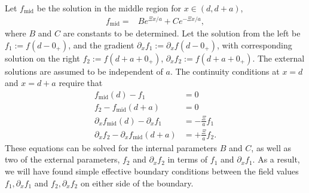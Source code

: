 Let $f_{\text{mid}}$ be the solution in the middle region for $x\in(d,d+a)$,   
    \begin{align}
      f_{\text{mid}} %
      =& Be^{\Xi x/a} + C e^{-\Xi x/a},
    \end{align}
    where $B$ and $C$ are constants to be determined.
    Let the solution from the left be $f_1:=f(d-0_+)$, and the gradient $\partial_x f_1:=\partial_x f(d-0_+)$,
    with corresponding solution on the right $f_2:=f(d+a+0_+)$, $\partial_x f_2:=f(d+a+0_+)$.  The
    external solutions are assumed to be independent of $a$.%
    The continuity conditions at $x=d$ and $x=d+a$ require that
    \begin{subequations}
      \begin{align}
        f_{\text{mid}}(d)-f_1 &= 0 \label{eq:f1}\\
        f_2- f_{\text{mid}}(d+a)&= 0 \label{eq:f2}\\
        \partial_xf_{\text{mid}}(d) -\partial_xf_1&= -\frac{\Xi}{a} f_1\label{eq:f1'}\\
        \partial_x f_2 -\partial_x f_{\text{mid}}(d+a)&= +\frac{\Xi}{a} f_2.\label{eq:f2'}
      \end{align}
    \end{subequations}
   These equations can be solved for the internal parameters $B$ and $C$, as well as two of the external 
   parameters, $f_2$ and $\partial_x f_2$ in terms of $f_1$ and $\partial_x f_1$.
   As a result, we will have found simple effective boundary conditions between
   the field values $f_1,\partial_xf_1$ and $f_2,\partial_xf_2$ on either side of the boundary.

